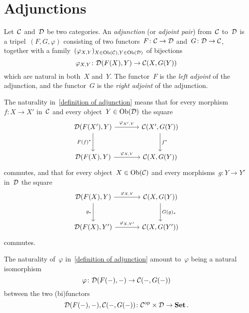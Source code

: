 \section{Adjunctions}


\begin{definition}
  \label{definition of adjunction}
  Let~$\mathcal{C}$ and~$\mathcal{D}$ be two categories.
  An \emph{adjunction} (or \emph{adjoint pair}) from~$\mathcal{C}$ to~$\mathcal{D}$ is a tripel~$(F,G,\varphi)$ consisting of two functors~$F \colon \mathcal{C} \to \mathcal{D}$ and~$G \colon \mathcal{D} \to \mathcal{C}$, together with a family~$(\varphi_{X,Y})_{X \in \operatorname{Ob}(\mathcal{C}), Y \in \operatorname{Ob}(\mathcal{D})}$ of bijections
  \[
            \varphi_{X,Y}
    \colon  \mathcal{D}(F(X), Y)
    \to     \mathcal{C}(X, G(Y))
  \]
  which are natural in both~$X$ and~$Y$.
  The functor~$F$ is the \emph{left adjoint} of the adjunction, and the functor~$G$ is the \emph{right adjoint} of the adjunction.
\end{definition}


\begin{remarknonum}
  The naturality in~\cref{definition of adjunction} means that for every morphism~$f \colon X \to X'$ in~$\mathcal{C}$ and every object~$Y \in \operatorname{Ob}(\mathcal{D})$ the square
  \[
    \begin{tikzcd}[sep = large]
        \Dcat(F(X'), Y)
        \arrow{r}[above]{\varphi_{X',Y}}
        \arrow{d}[left]{F(f)^*}
      & \Ccat(X', G(Y))
        \arrow{d}[right]{f^*}
      \\
        \Dcat(F(X), Y)
        \arrow{r}[above]{\varphi_{X,Y}}
      & \Ccat(X, G(Y))
    \end{tikzcd}
  \]
  commutes, and that for every object~$X \in \operatorname{Ob}(\mathcal{C})$ and every morphisms~$g \colon Y \to Y'$ in~$\mathcal{D}$ the square
  \[
    \begin{tikzcd}[sep = large]
        \Dcat(F(X), Y)
        \arrow{r}[above]{\varphi_{X,Y}}
        \arrow{d}[left]{g_*}
      & \Ccat(X, G(Y))
        \arrow{d}[right]{G(g)_*}
      \\
        \Dcat(F(X), Y')
        \arrow{r}[above]{\varphi_{X,Y'}}
      & \Ccat(X, G(Y'))
    \end{tikzcd}
  \]
  commutes.
\end{remarknonum}


\begin{remark*}
  The naturality of~$\varphi$ in~\cref{definition of adjunction} amount to~$\varphi$ being a natural isomorphism
  \[
            \varphi
    \colon  \mathcal{D}(F(-), -)
    \to     \mathcal{C}(-, G(-))
  \]
  between the two (bi)functors
  \[
            \mathcal{D}(F(-), -), \mathcal{C}(-, G(-))
    \colon  \mathcal{C}^{\mathrm{op}} \times \mathcal{D}
    \to     \mathbf{Set} \,.
  \]
\end{remark*}


